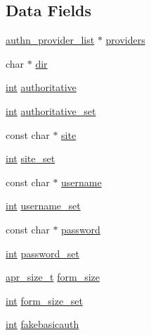 \subsection*{Data Fields}
\begin{DoxyCompactItemize}
\item 
\hyperlink{structauthn__provider__list}{authn\+\_\+provider\+\_\+list} $\ast$ \hyperlink{structauth__form__config__rec_aa43c88a0908edc2d94a1533ca4580bf4}{providers}
\item 
char $\ast$ \hyperlink{structauth__form__config__rec_a059f74c768ac1ae503283dd90b2391f9}{dir}
\item 
\hyperlink{pcre_8txt_a42dfa4ff673c82d8efe7144098fbc198}{int} \hyperlink{structauth__form__config__rec_a67e9ac8d0de80c51967219e6f4421221}{authoritative}
\item 
\hyperlink{pcre_8txt_a42dfa4ff673c82d8efe7144098fbc198}{int} \hyperlink{structauth__form__config__rec_a329e37482a69d8f8eb2cb1e993ecfe6f}{authoritative\+\_\+set}
\item 
const char $\ast$ \hyperlink{structauth__form__config__rec_a68cd43fb46f62924e6c6fb9e98a7217f}{site}
\item 
\hyperlink{pcre_8txt_a42dfa4ff673c82d8efe7144098fbc198}{int} \hyperlink{structauth__form__config__rec_a651f4f76113872a50f778d13fe2cc541}{site\+\_\+set}
\item 
const char $\ast$ \hyperlink{structauth__form__config__rec_a19cbc6524a61f3a5ed5f0621c2da6702}{username}
\item 
\hyperlink{pcre_8txt_a42dfa4ff673c82d8efe7144098fbc198}{int} \hyperlink{structauth__form__config__rec_a45d87400df3c836df3664554b3bd9664}{username\+\_\+set}
\item 
const char $\ast$ \hyperlink{structauth__form__config__rec_a600566b64e25e18d5dd062958ec4a064}{password}
\item 
\hyperlink{pcre_8txt_a42dfa4ff673c82d8efe7144098fbc198}{int} \hyperlink{structauth__form__config__rec_a15b3d2d7476dec96840116f4a27867e7}{password\+\_\+set}
\item 
\hyperlink{group__apr__platform_gaaa72b2253f6f3032cefea5712a27540e}{apr\+\_\+size\+\_\+t} \hyperlink{structauth__form__config__rec_a2d5ebbd30d3f1a895815e17d218728ed}{form\+\_\+size}
\item 
\hyperlink{pcre_8txt_a42dfa4ff673c82d8efe7144098fbc198}{int} \hyperlink{structauth__form__config__rec_ab8afc22c31dfd6a98e036eac1fd00406}{form\+\_\+size\+\_\+set}
\item 
\hyperlink{pcre_8txt_a42dfa4ff673c82d8efe7144098fbc198}{int} \hyperlink{structauth__form__config__rec_a44912c622239767ada042550a8fc995c}{fakebasicauth}

\end{DoxyCompactItemize}
